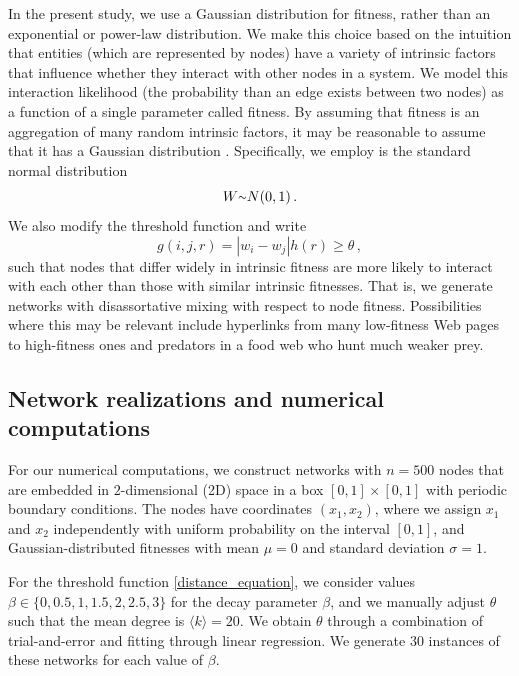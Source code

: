 \documentclass[%
 reprint,
 amsmath,amssymb,
 aps,
]{revtex4-1}
\begin{document}
In the present study, we use a Gaussian distribution for fitness, rather than an exponential or power-law distribution. We make this choice based on the intuition that entities (which are represented by nodes) have a variety of intrinsic factors that influence whether they interact with other nodes in a system. We model this interaction likelihood (the probability than an edge exists between two nodes) as a function of a single parameter called fitness. By assuming that fitness is an aggregation of many random intrinsic factors, it may be reasonable to assume that it has a Gaussian distribution \cite{frank}. Specifically, we employ is the standard normal distribution
\begin{equation}
        W {\raise.17ex\hbox{$\scriptstyle\mathtt{\sim}$}} N(0, 1)\,.
\end{equation}
We also modify the threshold function and write
\begin{equation}
    g(i, j, r) = |w_i - w_j| h(r) \geq \theta\,,
\end{equation}
such that nodes that differ widely in intrinsic fitness are more likely to interact with each other than those with similar intrinsic fitnesses. That is, we generate networks with disassortative mixing with respect to node fitness. Possibilities where this may be relevant include hyperlinks from many low-fitness Web pages to high-fitness ones and predators in a food web who hunt much weaker prey.


\subsection{Network realizations and numerical computations}\label{sec:fitness_numerics}

For our numerical computations, we construct networks with $n = 500$ nodes that are embedded in $2$-dimensional (2D) space in a box $[0, 1] \times [0, 1]$ with periodic boundary conditions. The nodes have coordinates $(x_1, x_2)$, where we assign $x_1$ and $x_2$ independently with uniform probability on the interval $[0,1]$, and Gaussian-distributed fitnesses with mean $\mu = 0$ and standard deviation $\sigma = 1$. 

For the threshold function \eqref{distance_equation}, we consider values $\beta \in \{ 0, 0.5, 1, 1.5, 2, 2.5, 3 \}$ for the decay parameter $\beta$, and we manually adjust $\theta$ such that the mean degree is $\langle k \rangle = 20$. We obtain $\theta$ through a combination of trial-and-error and fitting through linear regression. We generate $30$ instances of these networks for each value of $\beta$.
\end{document}
